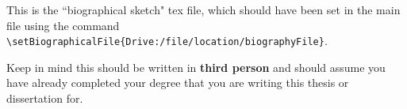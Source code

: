 This is the ``biographical sketch" tex file, which should have been set in the main file using the command \verb|\setBiographicalFile{Drive:/file/location/biographyFile}|.

Keep in mind this should be written in \textbf{third person} and should assume you have already completed your degree that you are writing this thesis or dissertation for. 